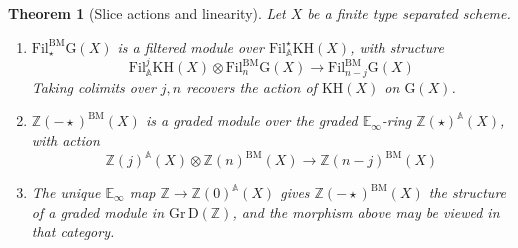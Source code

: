 \documentclass[11pt, twoside]{article}
\numberwithin{equation}{section}
\newtheorem{theorem}[equation]{Theorem}
\theoremstyle{definition}
\newcommand{\bb}[1]{\mathbb{#1}}
\newcommand{\fil}{\mathrm{Fil}}
\newcommand{\bm}{\mathrm{BM}}
\newcommand{\G}{\mathrm{G}}
\newcommand{\KH}{\mathrm{KH}}
\begin{document}
\begin{theorem}[Slice actions and linearity]
Let \(X\) be a finite type separated scheme.
\begin{enumerate}

\item \(\fil_\star^\bm \G(X)\) is a filtered module over \(\fil_\bb{A}^\star \KH(X)\), with structure 
\[\fil_\bb{A}^j \KH(X) \otimes \fil_n^\bm \G(X) \to \fil_{n - j}^\bm \G(X)\]
Taking colimits over \(j, n\) recovers the action of \(\KH(X)\) on \(\G(X)\).

\item \(\bb{Z}(- \star)^\bm(X)\) is a graded module over the graded \(\bb{E}_\infty\)-ring \(\bb{Z}(\star)^\bb{A}(X)\), with action 
\[\bb{Z}(j)^\bb{A}(X) \otimes \bb{Z}(n)^\bm(X) \to \bb{Z}(n - j)^\bm(X)\]

\item The unique \(\bb{E}_\infty\) map \(\bb{Z} \to \bb{Z}(0)^\bb{A}(X)\) gives \(\bb{Z}(- \star)^\bm(X)\) the structure of a graded module in \(\mathrm{Gr} \, \mathrm{D}(\bb{Z})\), and the morphism above may be viewed in that category.

\end{enumerate}
\end{theorem}
\end{document}
